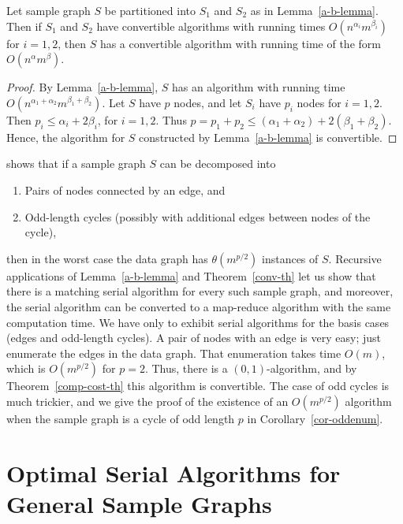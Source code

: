 \begin{theorem}
\label{conv-th}
Let sample graph $S$ be partitioned into $S_1$ and $S_2$ as in Lemma~\ref{a-b-lemma}.
Then if $S_1$ and $S_2$ have convertible algorithms with running times $O(n^{\alpha_i}m^{\beta_i})$ for $i=1,2$, then $S$ has a convertible algorithm with running time of the form $O(n^{\alpha}m^{\beta})$.
\end{theorem}

\begin{proof}
By Lemma~\ref{a-b-lemma}, $S$ has an algorithm with running time $O(n^{\alpha_1+\alpha_2}m^{\beta_1+\beta_2})$.
Let $S$ have $p$ nodes, and let $S_i$ have $p_i$ nodes for $i=1,2$.
Then $p_i\le\alpha_i+2\beta_i$, for $i=1,2$.
Thus $p=p_1+p_2\le (\alpha_1+\alpha_2) + 2(\beta_1+\beta_2)$.
Hence, the algorithm for $S$ constructed by Lemma~\ref{a-b-lemma} is convertible.
\end{proof}

\begin{example}
\label{decomp-ex}
\cite{Alon81} shows that if a sample graph $S$ can be decomposed into

\begin{enumerate}

\item
Pairs of nodes connected by an edge, and

\item
Odd-length cycles (possibly with additional edges between nodes of the cycle),

\end{enumerate}
then in the worst case the data graph has $\theta(m^{p/2})$ instances of $S$.
Recursive applications of Lemma~\ref{a-b-lemma} and Theorem~\ref{conv-th} let us show that there is a matching serial algorithm for every such sample graph, and moreover, the serial algorithm can be converted to a map-reduce algorithm with the same computation time.
We have only to exhibit serial algorithms for the basis cases (edges and odd-length cycles).
A pair of nodes with an edge is very easy; just enumerate the edges in the data graph.
That enumeration takes time $O(m)$, which is $O(m^{p/2})$ for $p=2$.
Thus, there is a $(0,1)$-algorithm, and by Theorem~\ref{comp-cost-th} this algorithm is convertible.  The case of odd cycles is much trickier, and we give the proof of the existence of an $O(m^{p/2})$ algorithm when the sample graph is a cycle of odd length $p$ in Corollary~\ref{cor-oddenum}.
\end{example}

\section{Optimal Serial Algorithms for General Sample Graphs}
\label{serial-alg-sect}


